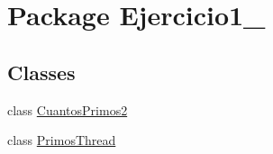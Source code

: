 \hypertarget{namespace_ejercicio1__2}{}\section{Package Ejercicio1\+\_}
\label{namespace_ejercicio1__2}
\subsection*{Classes}
\begin{DoxyCompactItemize}
\item 
class \mbox{\hyperlink{class_ejercicio1__2_1_1_cuantos_primos2}{Cuantos\+Primos2}}
\item 
class \mbox{\hyperlink{class_ejercicio1__2_1_1_primos_thread}{Primos\+Thread}}
\end{DoxyCompactItemize}
